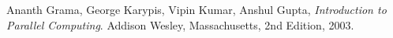 \documentclass[10pt,letterpaper,titlepage]{report}
\begin{document}

\begin{thebibliography}{9}

   Ananth Grama, George Karypis, Vipin Kumar, Anshul Gupta,
   \emph{Introduction to Parallel Computing}.
   Addison Wesley, Massachusetts,
   2nd Edition,
   2003.

\end{thebibliography}
\end{document}
